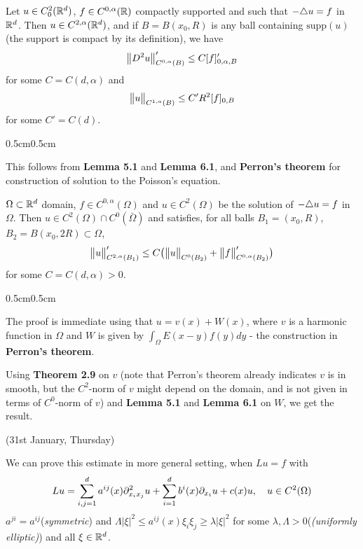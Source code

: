 \documentclass[12pt,a4paper]{article}
\newenvironment{proof}
{\begin{changemargin}{0.5cm}{0.5cm} 
	}%
	{\end{changemargin}
}
\newenvironment{p}
{\begin{proof} 
	}%
	{\end{proof}
}
\begin{document}
 Let $u\in C^2_0(\mathbb{R}^d)$, $f\in C^{0, \alpha}(\mathbb{R})$ compactly supported and such that $-\triangle u = f$ in $\mathbb{R}^d$. Then $u\in C^{2, \alpha}(\mathbb{R}^d)$, and if $B= B(x_0, R)$ is any ball containing $\text{supp}(u)$ (the support is compact by its definition), we have
\begin{align*}
\bigl\lVert D^2 u\bigr\rVert_{C^{0, \alpha}(B)}' \leq C [f]_{0, \alpha, B}'
\end{align*}
for some $C =C(d, \alpha)$ and
\begin{align*}
\bigl\lVert u\bigr\rVert_{C^{1,\alpha}(B)}\leq C' R^2 [f]_{0, B}
\end{align*}
for some $C' = C(d)$.
\begin{p}
\pf This follows from \textbf{Lemma 5.1} and \textbf{Lemma 6.1}, and \textbf{Perron's theorem} for construction of solution to the Poisson's equation.

\eop
\end{p}
\s

 $\Omega \subset \mathbb{R}^d$ domain, $f\in C^{0, \alpha}(\Omega)$ and $u\in C^2(\Omega)$ be the solution of $-\triangle u =f$ in $\Omega$. Then $u\in C^2(\Omega) \cap C^0(\bar{\Omega})$ and satisfies, for all balls $B_1 = (x_0, R)$, $B_2= B(x_0, 2R) \subset \Omega$,
\begin{align*}
\bigl\lVert u\bigr\rVert_{C^{2, \alpha}(B_1)}' \leq C \big(\bigl\lVert u\bigr\rVert_{C^0(B_2)} + \bigl\lVert f\bigr\rVert_{C^{0,\alpha}(B_2)}' \big) 
\end{align*}
for some $C =C(d, \alpha)>0$.
\begin{p}
\pf The proof is immediate using that $u= v(x) + W(x)$, where $v$ is a harmonic function in $\Omega$ and $W$ is given by $\int_{\Omega} E(x-y)f(y)dy$ - the construction in \textbf{Perron's theorem}.

\quad Using \textbf{Theorem 2.9} on $v$ (note that Perron's theorem already indicates $v$ is in smooth, but the $C^2$-norm of $v$ might depend on the domain, and is not given in terms of $C^0$-norm of $v$) and \textbf{Lemma 5.1} and \textbf{Lemma 6.1} on $W$, we get the result.

\eop
\end{p}
\s

\newday

(31st January, Thursday)
\s


We can prove this estimate in more general setting, when $Lu =f$ with
\begin{align*}
Lu = \sum_{i,j=1}^d a^{ij}(x) \partial^2_{x_i x_j} u + \sum_{i=1}^d b^i(x) \partial_{x_i} u + c(x)u, \quad u\in C^2(\Omega)
\end{align*}
$a^{ji} = a^{ij}$(\emph{symmetric}) and $\Lambda |\xi|^2 \leq a^{ij}(x) \xi_i \xi_j \geq \lambda |\xi|^2$ for some $\lambda, \Lambda >0$(\emph{(uniformly elliptic)}) and all $\xi \in \mathbb{R}^d$.
\s
\end{document}
